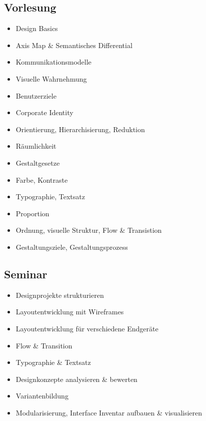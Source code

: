 \hypertarget{vorlesungpathlabel....srcmodulbeschreibungen-bachelor-bpo5ba_screendesign}{%
\subsection*{Vorlesung\label{../../src/modulbeschreibungen-bachelor-bpo5/BA_Screendesign}}\label{vorlesungpathlabel....srcmodulbeschreibungen-bachelor-bpo5ba_screendesign}}

\begin{itemize}
\tightlist
\item
  Design Basics
\item
  Axis Map \& Semantisches Differential
\item
  Kommunikationsmodelle
\item
  Visuelle Wahrnehmung
\item
  Benutzerziele
\item
  Corporate Identity
\item
  Orientierung, Hierarchisierung, Reduktion
\item
  Räumlichkeit
\item
  Gestaltgesetze
\item
  Farbe, Kontraste
\item
  Typographie, Textsatz
\item
  Proportion
\item
  Ordnung, visuelle Struktur, Flow \& Transistion
\item
  Gestaltungsziele, Gestaltungsprozess
\end{itemize}

\hypertarget{seminarpathlabel....srcmodulbeschreibungen-bachelor-bpo5ba_screendesign}{%
\subsection*{Seminar\label{../../src/modulbeschreibungen-bachelor-bpo5/BA_Screendesign}}\label{seminarpathlabel....srcmodulbeschreibungen-bachelor-bpo5ba_screendesign}}

\begin{itemize}
\tightlist
\item
  Designprojekte strukturieren
\item
  Layoutentwicklung mit Wireframes
\item
  Layoutentwicklung für verschiedene Endgeräte
\item
  Flow \& Transition
\item
  Typographie \& Textsatz
\item
  Designkonzepte analysieren \& bewerten
\item
  Variantenbildung
\item
  Modularisierung, Interface Inventar aufbauen \& visualisieren
\end{itemize}

